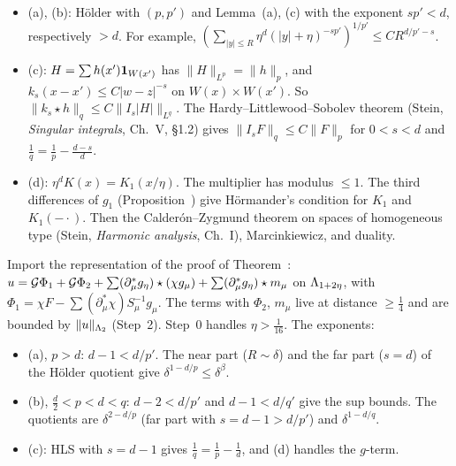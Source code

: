 \begin{detail}\label{d9:lp-kernels}
\begin{step}
\begin{itemize}
\item (a), (b): H\"older with $(p,p')$ and Lemma~(a), (c) with the exponent $sp'<d$, respectively $>d$. For example, $(\sum_{|y|\le R}\eta^d(|y|+\eta)^{-sp'})^{1/p'}\le CR^{d/p'-s}$.
\item (c): $H=\sum h(x')\mathbf 1_{W(x')}$ has $\|H\|_{L^p}=\|h\|_p$, and $k_s(x-x')\le C|w-z|^{-s}$ on $W(x)\times W(x')$. So $\|k_s\star h\|_q\le C\|I_s|H|\|_{L^q}$. The Hardy--Littlewood--Sobolev theorem (Stein, \emph{Singular integrals}, Ch.~V, \S1.2) gives $\|I_sF\|_q\le C\|F\|_p$ for $0<s<d$ and $\frac1q=\frac1p-\frac{d-s}d$.
\item (d): $\eta^dK(x)=K_1(x/\eta)$. The multiplier has modulus $\le1$. The third differences of $g_1$ (Proposition~) give H\"ormander's condition for $K_1$ and $K_1(-\cdot)$. Then the Calder\'on--Zygmund theorem on spaces of homogeneous type (Stein, \emph{Harmonic analysis}, Ch.~I), Marcinkiewicz, and duality.
\end{itemize}
\end{step}
\begin{step}
Import the representation  of the proof of Theorem~: $u=\mathcal G\Phi_1+\mathcal G\Phi_2+\sum(\partial^*_\mu g_\eta)\star(\chi g_\mu)+\sum(\partial^*_\mu g_\eta)\star m_\mu$ on $\Lambda_{1+2\eta}$, with $\Phi_1=\chi F-\sum(\partial^*_\mu\chi)S^{-1}_\mu g_\mu$. The terms with $\Phi_2$, $m_\mu$ live at distance $\ge\frac14$ and are bounded by $\|u\|_{\Lambda_2}$ (Step~2). Step~0 handles $\eta>\frac1{16}$. The exponents:
\begin{itemize}
\item (a), $p>d$: $d-1<d/p'$. The near part ($R\sim\delta$) and the far part ($s=d$) of the H\"older quotient give $\delta^{1-d/p}\le\delta^\beta$.
\item (b), $\frac d2<p<d<q$: $d-2<d/p'$ and $d-1<d/q'$ give the sup bounds. The quotients are $\delta^{2-d/p}$ (far part with $s=d-1>d/p'$) and $\delta^{1-d/q}$.
\item (c): HLS with $s=d-1$ gives $\frac1q=\frac1p-\frac1d$, and (d) handles the $g$-term.
\end{itemize}

\end{step}
\end{detail}
